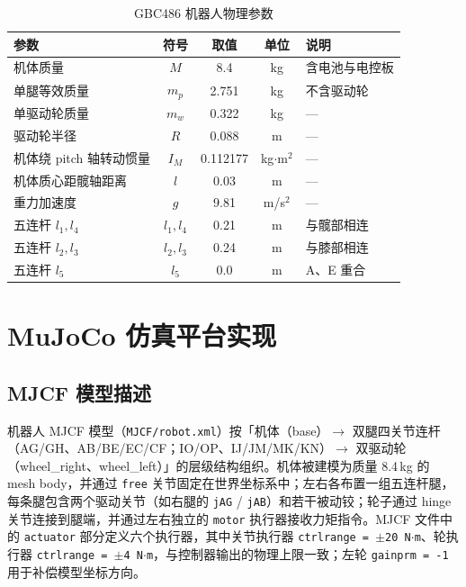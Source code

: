 \documentclass{smbuthesis}
\begin{document}
\begin{table}[H]
\centering
\caption{GBC486 机器人物理参数}
\label{tab:params}
\begin{tabular}{l c c c l}
\toprule
\textbf{参数} & \textbf{符号} & \textbf{取值} & \textbf{单位} & \textbf{说明} \\
\midrule
机体质量              & $M$       & 8.4      & kg       & 含电池与电控板 \\
单腿等效质量          & $m_p$     & 2.751    & kg       & 不含驱动轮 \\
单驱动轮质量          & $m_w$     & 0.322    & kg       & --- \\
驱动轮半径            & $R$       & 0.088    & m        & --- \\
机体绕 pitch 轴转动惯量 & $I_M$    & 0.112177 & kg$\cdot$m$^2$ & --- \\
机体质心距髋轴距离    & $l$       & 0.03     & m        & --- \\
重力加速度            & $g$       & 9.81     & m/s$^2$  & --- \\
五连杆 $l_1, l_4$    & $l_1, l_4$ & 0.21    & m        & 与髋部相连 \\
五连杆 $l_2, l_3$    & $l_2, l_3$ & 0.24    & m        & 与膝部相连 \\
五连杆 $l_5$         & $l_5$     & 0.0      & m        & A、E 重合 \\
\bottomrule
\end{tabular}
\end{table}

\section{MuJoCo 仿真平台实现}

\subsection{MJCF 模型描述}

机器人 MJCF 模型（\texttt{MJCF/robot.xml}）按「机体（base）$\to$ 双腿四关节连杆（AG/GH、AB/BE/EC/CF；IO/OP、IJ/JM/MK/KN）$\to$ 双驱动轮（wheel\_right、wheel\_left）」的层级结构组织。机体被建模为质量 8.4\,kg 的 mesh body，并通过 \texttt{free} 关节固定在世界坐标系中；左右各布置一组五连杆腿，每条腿包含两个驱动关节（如右腿的 \texttt{jAG} / \texttt{jAB}）和若干被动铰；轮子通过 hinge 关节连接到腿端，并通过左右独立的 \texttt{motor} 执行器接收力矩指令。MJCF 文件中的 \texttt{actuator} 部分定义六个执行器，其中关节执行器 \texttt{ctrlrange = $\pm$20\,N$\cdot$m}、轮执行器 \texttt{ctrlrange = $\pm$4\,N$\cdot$m}，与控制器输出的物理上限一致；左轮 \texttt{gainprm = -1} 用于补偿模型坐标方向。
\end{document}
